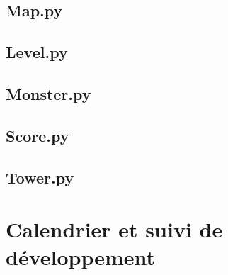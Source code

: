 \documentclass[a4paper]{article}
\begin{document}
        \subsection{Map.py}
            \begin{alltt}
                 
            \end{alltt}

        \subsection{Level.py}
            \begin{alltt}
                
            \end{alltt}

        \subsection{Monster.py}
            \begin{alltt}
                
            \end{alltt}

        \subsection{Score.py}
            \begin{alltt}
                
            \end{alltt}

        \subsection{Tower.py}
            \begin{alltt}
                
            \end{alltt}

    \section{Calendrier et suivi de développement}
\end{document}

